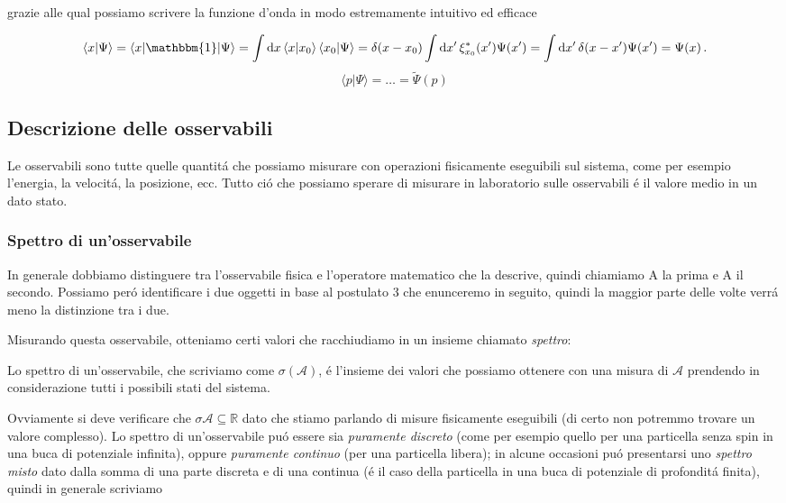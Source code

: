 grazie alle qual possiamo scrivere la funzione d'onda in modo estremamente intuitivo ed efficace
 
$$\langle x|\Psi\rangle=\langle x|\mathbbm{1}|\Psi\rangle=\int\mathrm{d}x\,\langle x|x_{0}\rangle\,\langle x_{0}|\Psi\rangle=\delta(x-x_{0})\int\mathrm{d}x^{\prime}\,\xi_{x_{0}}^{*}(x^{\prime})\Psi(x^{\prime})=\int\mathrm{d}x^{\prime}\,\delta(x-x^{\prime})\Psi(x^{\prime})=\Psi(x)\,.$$
$$\langle p|\Psi\rangle=\ldots={\tilde{\Psi}}(p)$$

\subsection{Descrizione delle osservabili}

Le osservabili sono tutte quelle quantit\'a che possiamo misurare con operazioni fisicamente eseguibili sul sistema, come per esempio l'energia, la velocit\'a, la posizione, ecc. Tutto ci\'o che possiamo sperare di misurare in laboratorio sulle osservabili \'e il valore medio in un dato stato.

\subsubsection{Spettro di un'osservabile}

In generale dobbiamo distinguere tra l'osservabile fisica e l'operatore matematico che la descrive, quindi chiamiamo A la prima e A il secondo. Possiamo per\'o identificare i due oggetti in base al postulato 3 che enunceremo in seguito, quindi la maggior parte delle volte verr\'a meno la distinzione tra i due.

Misurando questa osservabile, otteniamo certi valori che racchiudiamo in un insieme chiamato \textit{spettro}:

\begin{definizione}
	
	Lo spettro di un'osservabile, che scriviamo come $\sigma(\mathcal{A})$, \'e l'insieme dei valori che possiamo ottenere con una misura di $\mathcal{A}$ prendendo in considerazione tutti i possibili stati del sistema.
\end{definizione}

Ovviamente si deve verificare che $\sigma \mathcal{A} \subseteq \mathbb{R}$ dato che stiamo parlando di misure fisicamente eseguibili (di certo non potremmo trovare un valore complesso). Lo spettro di un'osservabile pu\'o essere sia \textit{puramente discreto} (come per esempio quello per una particella senza spin in una buca di potenziale infinita), oppure \textit{puramente continuo} (per una particella libera); in alcune occasioni pu\'o presentarsi uno \textit{spettro misto} dato dalla somma di una parte discreta e di una continua (\'e il caso della particella in una buca di potenziale di profondit\'a finita),
quindi in generale scriviamo 

